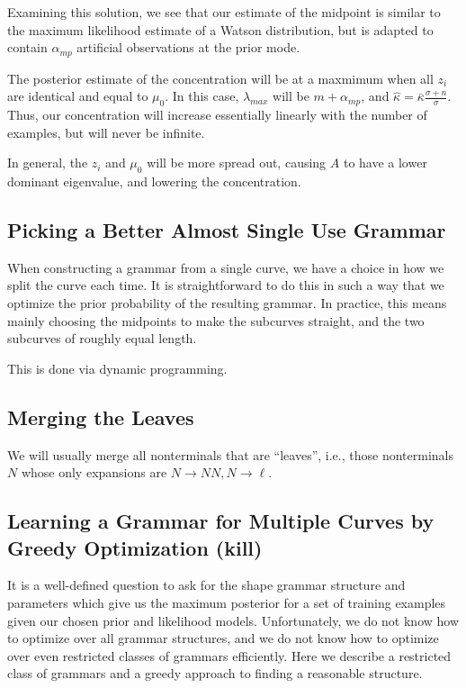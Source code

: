 Examining this solution, we see that our estimate of the
midpoint is similar to the maximum likelihood estimate of
a Watson distribution, but is adapted to contain
$\alpha_{mp}$ artificial observations at the prior mode.

The posterior estimate of the concentration will be at
a maxmimum when all $z_i$ are identical and equal to 
$\mu_0$. In this case, $\lambda_{max}$ will be
$m + \alpha_{mp}$, and $\widehat{\kappa} = 
\bar{\kappa} \frac{\sigma+n}{\sigma}$. Thus, our concentration will
increase essentially linearly with the number of examples, but will never
be infinite.

In general, the $z_i$ and $\mu_0$ will be more spread out, causing $A$
to have a lower dominant eigenvalue, and lowering the concentration.

\subsection{Picking a Better Almost Single Use Grammar}

When constructing a grammar from a single curve, we have a choice in
how we split the curve each time. It is straightforward to do this in
such a way that we optimize the prior probability of the resulting
grammar. In practice, this means mainly choosing the midpoints to make
the subcurves straight, and the two subcurves of roughly equal length.

This is done via dynamic programming.

\subsection{Merging the Leaves}

We will usually merge all nonterminals that are ``leaves'', i.e.,
those nonterminals $N$ whose only expansions are $N\to NN, N\to \ell$.

\subsection{Learning a Grammar for Multiple Curves by Greedy Optimization (kill)}

It is a well-defined question to ask for the shape grammar structure
and parameters which give us the maximum posterior for a set of
training examples given our chosen prior and likelihood
models. Unfortunately, we do not know how to optimize over all grammar
structures, and we do not know how to optimize over even restricted
classes of grammars efficiently. Here we describe a restricted class
of grammars and a greedy approach to finding a reasonable structure.

